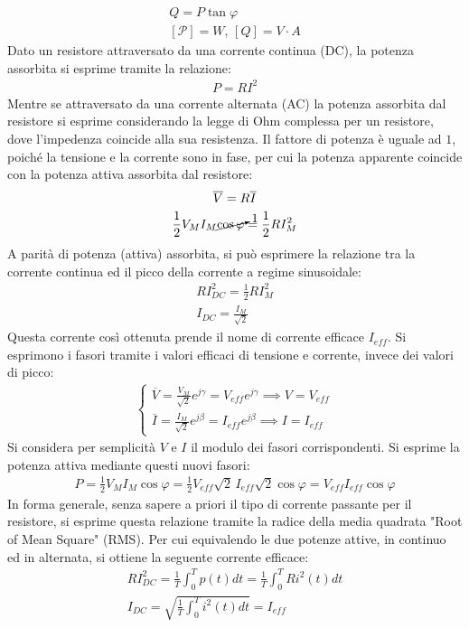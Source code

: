 \documentclass{article}
\numberwithin{equation}{subsection}
\begin{document}
\begin{gather*}
    Q=P\tan\varphi\\
    [\mathcal{P}]=W,\,[Q]=V\cdot A
\end{gather*}
Dato un resistore attraversato da una corrente continua (DC), la potenza assorbita si esprime tramite la relazione:
\begin{gather*}
    P=RI^2
\end{gather*}
Mentre se attraversato da una corrente alternata (AC) la potenza assorbita dal resistore si esprime considerando la legge di Ohm complessa per un resistore, dove 
l'impedenza coincide alla sua resistenza. Il fattore di potenza è uguale ad $1$, poiché la tensione e la corrente sono in fase, per cui la potenza apparente coincide con la 
potenza attiva assorbita dal resistore:
\begin{gather*}
    \overline{V}=R\overline{I}\\
    \displaystyle\frac{1}{2}V_MI_M\cancelto{1}{\cos\varphi}=\frac{1}{2}RI_M^2
\end{gather*}
A parità di potenza (attiva) assorbita, si può esprimere la relazione tra la corrente continua ed il picco della corrente a regime sinusoidale:
\begin{gather*}
    RI_{DC}^2=\displaystyle\frac{1}{2}RI_M^2\\
    I_{DC}=\displaystyle\frac{I_M}{\sqrt{2}}
\end{gather*}
Questa corrente così ottenuta prende il nome di corrente efficace $I_{eff}$. 
Si esprimono i fasori tramite i valori efficaci di tensione e corrente, invece dei valori di picco:
\begin{gather*}
    \begin{cases}
        \overline{V}=\displaystyle\frac{V_{M}}{\sqrt{2}}e^{j\gamma}=V_{eff}e^{j\gamma}\implies V=V_{eff}\\
        \overline{I}=\displaystyle\frac{I_{M}}{\sqrt{2}}e^{j\beta}=I_{eff}e^{j\beta}\implies I=I_{eff}
    \end{cases}
\end{gather*}
Si considera per semplicità $V$ e $I$ il modulo dei fasori corrispondenti. 
Si esprime la potenza attiva mediante questi nuovi fasori: 
\begin{gather*}
    P=\displaystyle\frac{1}{2}V_MI_M\cos\varphi=\frac{1}{2}V_{eff}\sqrt{2}\,I_{eff}\sqrt{2}\cos\varphi=V_{eff}I_{eff}\cos\varphi
\end{gather*}
In forma generale, senza sapere a priori il tipo di corrente passante per il resistore, si esprime questa relazione tramite la radice 
della media quadrata "Root of Mean Square" (RMS). Per cui equivalendo le due potenze attive, in continuo ed in alternata, si ottiene la seguente corrente efficace: 
\begin{gather*}
    RI_{DC}^2=\displaystyle\frac{1}{T}\int_0^Tp(t)dt=\frac{1}{T}\int_0^TRi^2(t)dt\\
    I_{DC}=\displaystyle\sqrt{\frac{1}{T}\int_0^Ti^2(t)dt}=I_{eff}
\end{gather*}
\end{document}
